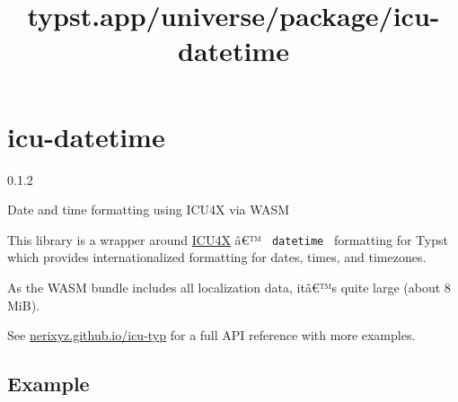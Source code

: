 \title{typst.app/universe/package/icu-datetime}

\label{banner}
\section{icu-datetime}\label{icu-datetime}

{ 0.1.2 }

Date and time formatting using ICU4X via WASM

\label{readme}
This library is a wrapper around
\href{https://github.com/unicode-org/icu4x}{ICU4X} â€™
\texttt{\ datetime\ } formatting for Typst which provides
internationalized formatting for dates, times, and timezones.

As the WASM bundle includes all localization data, itâ€™s quite large
(about 8 MiB).

See \href{https://nerixyz.github.io/icu-typ}{nerixyz.github.io/icu-typ}
for a full API reference with more examples.

\subsection{Example}\label{example}

